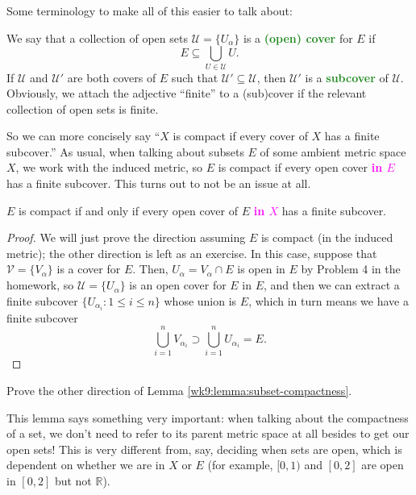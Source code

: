 \documentclass[10pt]{scrartcl}
\providecommand{\RR}{\mathbb R}
\providecommand{\alert}[1]{{\sffamily\textbf{\textcolor{magenta}{#1}}}}
\providecommand{\vocab}[1]{{\textbf{\textcolor{ForestGreen}{#1}}}}
\begin{document}
Some terminology to make all of this easier to talk about:
\begin{definition}\label{wk7:def:covers-subcovers}
	We say that a collection of open sets $\mathcal {U} = \{U_\alpha\}$
	is a \vocab{(open) cover} for $E$ if
	\[E\subseteq\bigcup_{U\in\mathcal U} U.\]
	If $\mathcal U$ and $\mathcal U'$ are both covers of $E$
	such that $\mathcal U' \subseteq \mathcal U$,
	then $\mathcal U'$ is a \vocab{subcover} of $\mathcal U$.
	Obviously, we attach the adjective ``finite'' to a (sub)cover
	if the relevant collection of open sets is finite.
\end{definition}

So we can more concisely say
``$X$ is compact if every cover of $X$ has a finite subcover.''
As usual, when talking about subsets $E$ of some ambient metric space $X$,
we work with the induced metric, so $E$ is compact
if every open cover \alert{in $E$} has a finite subcover.
This turns out to not be an issue at all.
\begin{lemma}\label{wk9:lemma:subset-compactness}
	$E$ is compact if and only if
	every open cover of $E$ \alert{in $X$} has a finite subcover.
\end{lemma}

\begin{proof}
	We will just prove the direction assuming $E$ is compact
	(in the induced metric);
	the other direction is left as an exercise. In this case, suppose that
	$\mathcal{V} = \{V_\alpha\}$ is a cover for $E$.
	Then, $U_\alpha = V_\alpha\cap E$ is open in $E$
	by Problem 4 in the homework, so $\mathcal{U} = \{U_\alpha\}$
	is an open cover for $E$ in $E$,
	and then we can extract a finite subcover
	$\{U_{\alpha_i} : 1\le i\le n\}$ whose union is $E$,
	which in turn means we have a finite subcover
	\[\bigcup_{i=1}^n V_{\alpha_i}\supset
	\bigcup_{i=1}^n U_{\alpha_i} = E.\]
\end{proof}

\begin{exercise}
	Prove the other direction of Lemma \ref{wk9:lemma:subset-compactness}.
\end{exercise}

This lemma says something very important:
when talking about the compactness of a set,
we don't need to refer to its parent metric space at all
besides to get our open sets!
This is very different from, say, deciding when sets are open,
which is dependent on whether we are in $X$ or $E$
(for example, $[0,1)$ and $[0,2]$ are open in $[0,2]$ but not $\RR$).
\end{document}
